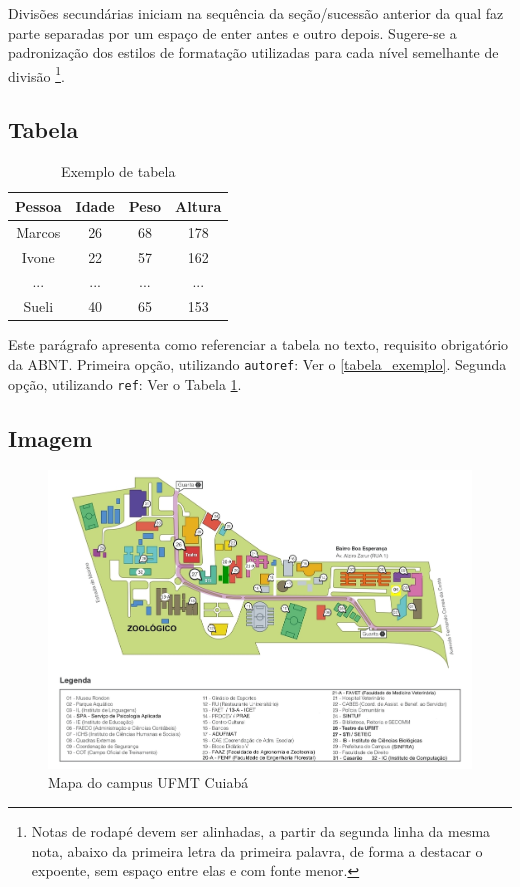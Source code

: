 \documentclass[
	12pt,				%
	openright,			%
	oneside,			%
	a4paper,			%
	english,			%
	french,				%
	spanish,			%
	brazil				%
	]{abntex2UFMT}
\begin{document}
Divisões secundárias iniciam na sequência da seção/sucessão anterior da qual faz parte separadas por um espaço de enter antes e outro depois. Sugere-se a padronização dos estilos de formatação utilizadas para cada nível semelhante de divisão \footnote{Notas de rodapé devem ser alinhadas, a partir da segunda linha da mesma nota, abaixo da primeira letra da primeira palavra, de forma a destacar o expoente, sem espaço entre elas e com fonte menor.}.

\subsection{Tabela}

\begin{table}[htb]
\centering
\caption{\label{tabela_exemplo}Exemplo de tabela}
\begin{tabular}{cccc}
\hline 
\textbf{Pessoa} & \textbf{Idade} & \textbf{Peso} & \textbf{Altura}\\
\hline 
Marcos & 26 & 68 & 178\\
Ivone & 22 & 57 & 162\\
...  & ... & ... & ...\\
Sueli & 40 & 65 & 153\\
\hline 
\end{tabular}
\end{table}

Este parágrafo apresenta como referenciar a tabela no texto, requisito
obrigatório da ABNT. 
Primeira opção, utilizando \texttt{autoref}: Ver o \autoref{tabela_exemplo}. 
Segunda opção, utilizando  \texttt{ref}: Ver o Tabela \ref{tabela_exemplo}.

\subsection{Imagem}

\begin{figure}[htb]
\centering
\caption{\label{figura_exemplo}Mapa do campus UFMT Cuiabá}
\includegraphics[scale=0.2]{figs/mapa.png}
\end{figure}
\end{document}
